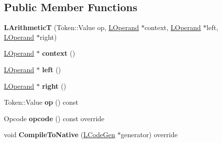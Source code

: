 \subsection*{Public Member Functions}
\begin{DoxyCompactItemize}
\item 
{\bfseries L\+ArithmeticT} (Token\+::\+Value op, \hyperlink{classv8_1_1internal_1_1_l_operand}{L\+Operand} $\ast$context, \hyperlink{classv8_1_1internal_1_1_l_operand}{L\+Operand} $\ast$left, \hyperlink{classv8_1_1internal_1_1_l_operand}{L\+Operand} $\ast$right)\hypertarget{classv8_1_1internal_1_1_l_arithmetic_t_aed09089ca0bd6bd7614897b04b1d89d6}{}\label{classv8_1_1internal_1_1_l_arithmetic_t_aed09089ca0bd6bd7614897b04b1d89d6}

\item 
\hyperlink{classv8_1_1internal_1_1_l_operand}{L\+Operand} $\ast$ {\bfseries context} ()\hypertarget{classv8_1_1internal_1_1_l_arithmetic_t_ab306728ac49c78f6fe8eec0faafec98d}{}\label{classv8_1_1internal_1_1_l_arithmetic_t_ab306728ac49c78f6fe8eec0faafec98d}

\item 
\hyperlink{classv8_1_1internal_1_1_l_operand}{L\+Operand} $\ast$ {\bfseries left} ()\hypertarget{classv8_1_1internal_1_1_l_arithmetic_t_a62140bad6c260c92f8c86d7083874a9c}{}\label{classv8_1_1internal_1_1_l_arithmetic_t_a62140bad6c260c92f8c86d7083874a9c}

\item 
\hyperlink{classv8_1_1internal_1_1_l_operand}{L\+Operand} $\ast$ {\bfseries right} ()\hypertarget{classv8_1_1internal_1_1_l_arithmetic_t_ad65b8493527788115befa0634f9de1ae}{}\label{classv8_1_1internal_1_1_l_arithmetic_t_ad65b8493527788115befa0634f9de1ae}

\item 
Token\+::\+Value {\bfseries op} () const \hypertarget{classv8_1_1internal_1_1_l_arithmetic_t_ab6979d3ffa80748d912d58539cfe971c}{}\label{classv8_1_1internal_1_1_l_arithmetic_t_ab6979d3ffa80748d912d58539cfe971c}

\item 
Opcode {\bfseries opcode} () const  override\hypertarget{classv8_1_1internal_1_1_l_arithmetic_t_a8fb5ae23dc6ddac5a72adfe9028fb08d}{}\label{classv8_1_1internal_1_1_l_arithmetic_t_a8fb5ae23dc6ddac5a72adfe9028fb08d}

\item 
void {\bfseries Compile\+To\+Native} (\hyperlink{classv8_1_1internal_1_1_l_code_gen}{L\+Code\+Gen} $\ast$generator) override\hypertarget{classv8_1_1internal_1_1_l_arithmetic_t_a2ca63e96840eacc1494d0d39ebe782a5}{}\label{classv8_1_1internal_1_1_l_arithmetic_t_a2ca63e96840eacc1494d0d39ebe782a5}


\end{DoxyCompactItemize}
